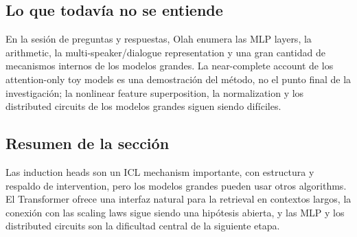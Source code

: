 
\subsection{Lo que todavía no se entiende}

En la sesión de preguntas y respuestas, Olah enumera las MLP layers, la arithmetic, la multi-speaker/dialogue representation y una gran cantidad de mecanismos internos de los modelos grandes. La near-complete account de los attention-only toy models es una demostración del método, no el punto final de la investigación; la nonlinear feature superposition, la normalization y los distributed circuits de los modelos grandes siguen siendo difíciles.


\subsection{Resumen de la sección}

Las induction heads son un ICL mechanism importante, con estructura y respaldo de intervention, pero los modelos grandes pueden usar otros algorithms. El Transformer ofrece una interfaz natural para la retrieval en contextos largos, la conexión con las scaling laws sigue siendo una hipótesis abierta, y las MLP y los distributed circuits son la dificultad central de la siguiente etapa.

